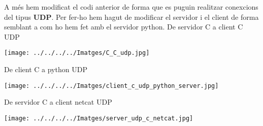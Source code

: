 \documentclass[11p]{article}
\begin{document}
A més hem modificat el codi anterior de forma que es puguin realitzar conexcions del tipus \textbf{UDP}. Per fer-ho hem hagut de modificar el servidor i el client de forma semblant a com ho hem fet amb el servidor python.
\newline
\newline
De servidor C a client C UDP
\newline
\newline
\centerline{\texttt{[image: ../../../../Imatges/C\_C\_udp.jpg]} }
\newline
\newline
De client C a python UDP
\newline
\newline
\centerline{\texttt{[image: ../../../../Imatges/client\_c\_udp\_python\_server.jpg]}  }
\newline
De servidor C a client netcat UDP
\newline
\newline
\centerline{\texttt{[image: ../../../../Imatges/server\_udp\_c\_netcat.jpg]} }
\end{document}
